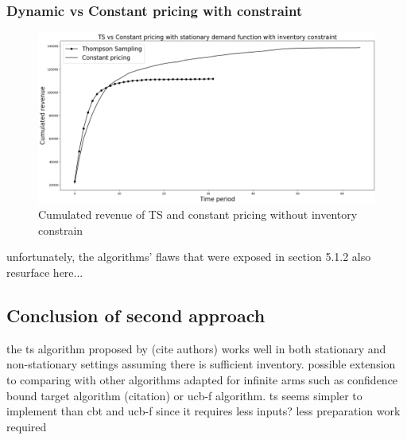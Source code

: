 \documentclass[a4paper]{article}
\begin{document}
\subsubsection{Dynamic vs Constant pricing with constraint}
\begin{figure}[h]
	\centering
	\includegraphics[width=1.03\textwidth]{3.png}
	\caption{\label{fig:3}Cumulated revenue of TS and constant pricing without inventory constrain}
\end{figure}
unfortunately, the algorithms' flaws that were exposed in section 5.1.2 also resurface here...
\subsection{Conclusion of second approach}
the ts algorithm proposed by (cite authors) works well in both stationary and non-stationary settings assuming there is sufficient inventory. possible extension to comparing with other algorithms adapted for infinite arms such as confidence bound target algorithm (citation) or ucb-f algorithm. ts seems simpler to implement than cbt and ucb-f since it requires less inputs? less preparation work required
\end{document}

